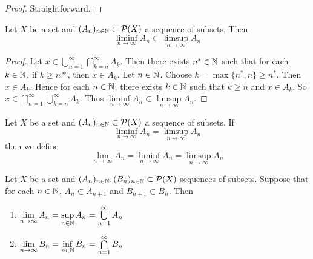 \documentclass{book}
\begin{document}
	\begin{proof}
		Straightforward.
	\end{proof}
	
	\begin{ex}  
		Let $X$ be a set and $(A_n)_{n \in \mathbb{N}} \subset \mathcal{P}(X)$ a sequence of subsets. Then $$\liminf_{n \rightarrow \infty} A_n \subset \limsup_{n \rightarrow \infty} A_n$$
	\end{ex}
	
	\begin{proof}
		Let $x \in \bigcup\limits_{n=1}^{\infty} \bigcap\limits_{k =n}^{\infty} A_k$. Then there exists $n^* \in \mathbb{N}$ such that for each $k \in \mathbb{N}$, if $k \geq n*$, then $x \in A_k$. Let $n \in \mathbb{N}$. Choose $k = \max\{n^*,n\} \geq n^*$. Then $x \in A_k$. Hence for each $n \in \mathbb{N}$, there exists $k \in \mathbb{N}$ such that $k \geq n$ and $x \in A_k$. So $x \in \bigcap\limits_{n=1}^{\infty} \bigcup\limits_{k=n}^{\infty} A_k$. Thus $\liminf\limits_{n \rightarrow \infty}A_n \subset \limsup\limits_{n \rightarrow \infty}A_n$.
	\end{proof}
	
	\begin{defn}  
		Let $X$ be a set and $(A_n)_{n \in \mathbb{N}} \subset \mathcal{P}(X)$ a sequence of subsets. If $$\liminf_{n \rightarrow \infty} A_n = \limsup_{n \rightarrow \infty} A_n$$ then we define $$\lim_{n \rightarrow \infty}A_n = \liminf_{n \rightarrow \infty} A_n = \limsup_{n \rightarrow \infty} A_n$$ 
	\end{defn}
	
	\begin{ex}  
		Let $X$ be a set and $(A_n)_{n \in \mathbb{N}}, (B_n)_{n \in \mathbb{N}} \subset \mathcal{P}(X)$ sequences of subsets. Suppose that for each $n \in \mathbb{N}$, $A_n \subset A_{n+1}$ and $B_{n+1} \subset B_n$. Then 
		\begin{enumerate}
			\item $\lim \limits_{n \rightarrow \infty} A_n = \sup\limits_{n \in \mathbb{N}}A_n = \bigcup\limits_{n=1}^{\infty}A_n$
			\item $\lim \limits_{n \rightarrow \infty} B_n = \inf\limits_{n \in \mathbb{N}}B_n = \bigcap\limits_{n=1}^{\infty}B_n$
		\end{enumerate}
	\end{ex}
	
\end{document}
